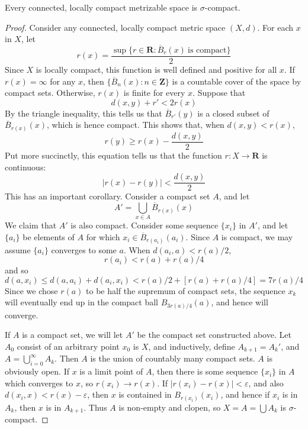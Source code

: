 \begin{lemma}[$3) \to (1$]
    Every connected, locally compact metrizable space is $\sigma$-compact.
\end{lemma}
\begin{proof}
    Consider any connected, locally compact metric space $(X,d)$. For each $x$ in $X$, let
    \[ r(x) = \frac{\sup \{ r \in \mathbf{R} : \overline{B}_r(x)\ \text{is compact} \}}{2} \]
    Since $X$ is locally compact, this function is well defined and positive for all $x$. If $r(x) = \infty$ for any $x$, then $\{ \overline{B}_n(x) : n \in \mathbf{Z} \}$ is a countable cover of the space by compact sets. Otherwise, $r(x)$ is finite for every $x$. Suppose that
    \[ d(x,y) + r' < 2r(x) \]
    By the triangle inequality, this tells us that $\overline{B}_{r'}(y)$ is a closed subset of $\overline{B}_{r(x)}(x)$, which is hence compact. This shows that, when $d(x,y) < r(x)$,
    \[ r(y) \geq r(x) - \frac{d(x,y)}{2} \]
    Put more succinctly, this equation tells us that the function $r:X \to \mathbf{R}$ is continuous:
    \[ |r(x) - r(y)| < \frac{d(x,y)}{2} \]
    This has an important corollary. Consider a compact set $A$, and let
    \[ A' = \bigcup_{x \in A} \overline{B}_{r(x)}(x) \]
    We claim that $A'$ is also compact. Consider some sequence $\{ x_i \}$ in $A'$, and let $\{ a_i \}$ be elements of $A$ for which $x_i \in \overline{B}_{r(a_i)}(a_i)$. Since $A$ is compact, we may assume $\{ a_i \}$ converges to some $a$. When $d(a_i, a) < r(a)/2$,
    \[ r(a_i) < r(a) + r(a)/4 \]
    and so
    \[ d(a,x_i) \leq d(a,a_i) + d(a_i,x_i) < r(a)/2 + [r(a) + r(a)/4] = 7r(a)/4 \]
    Since we chose $r(a)$ to be half the supremum of compact sets, the sequence $x_k$ will eventually end up in the compact ball $B_{3r(a)/4}(a)$, and hence will converge.

    If $A$ is a compact set, we will let $A'$ be the compact set constructed above. Let $A_0$ consist of an arbitrary point $x_0$ is $X$, and inductively, define $A_{k+1} = A_k'$, and $A = \bigcup_{i = 0}^\infty A_k$. Then $A$ is the union of countably many compact sets. $A$ is obviously open. If $x$ is a limit point of $A$, then there is some sequence $\{ x_i \}$ in $A$ which converges to $x$, so $r(x_i) \to r(x)$. If $|r(x_i) - r(x)| < \varepsilon$, and also $d(x_i,x) < r(x) - \varepsilon$, then $x$ is contained in $B_{r(x_i)}(x_i)$, and hence if $x_i$ is in $A_k$, then $x$ is in $A_{k+1}$. Thus $A$ is non-empty and clopen, so $X = A = \bigcup A_k$ is $\sigma$-compact.
\end{proof}


